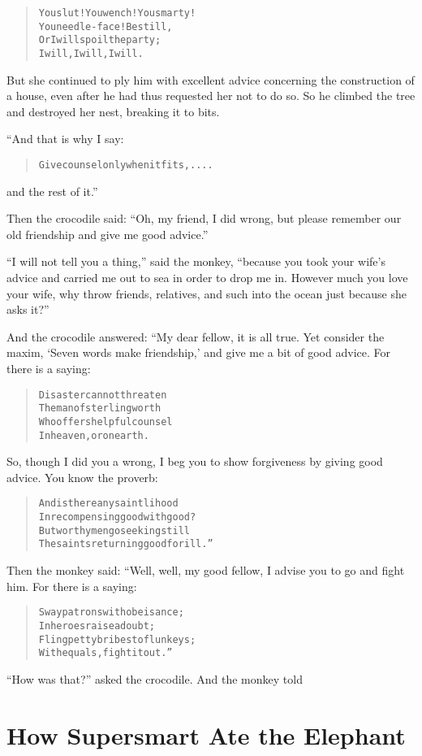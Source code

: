 \documentclass[article, twoside, 10pt]{memoir}
\renewenvironment{verbatim}{%
\begin{quote}%
\vskip -10pt%
\begin{alltt}\normalfont\small}{\end{alltt}%
\end{quote}%
\vskip -10pt
} %
\begin{document}
\begin{verbatim}
You slut! You wench! You smarty!
    You needle-face! Be still,
Or I will spoil the party;
    I will, I will, I will.
\end{verbatim}
But she continued to ply him with excellent advice concerning the
construction of a house, even after he had thus requested her not
to do so. So he climbed the tree and destroyed her nest, breaking
it to bits.

“And that is why I say:

\begin{verbatim}
Give counsel only when it fits, ....
\end{verbatim}
and the rest of it.”

Then the crocodile said:
``Oh, my friend, I did wrong, but please remember our old friendship and give me good advice.''

``I will not tell you a thing,'' said the monkey,
``because you took your wife's advice and carried me out to sea in order to drop me in. However much you love your wife, why throw friends, relatives, and such into the ocean just because she asks it?''

And the crocodile answered: “My dear fellow, it is all true. Yet
consider the maxim, `Seven words make friendship,' and give me a
bit of good advice. For there is a saying:

\begin{verbatim}
Disaster cannot threaten
    The man of sterling worth
Who offers helpful counsel{\textemdash}
    In heaven, or on earth.
\end{verbatim}
So, though I did you a wrong, I beg you to show forgiveness by
giving good advice. You know the proverb:

\begin{verbatim}
And is there any saintlihood
In recompensing good with good?
But worthy men go seeking still
The saints returning good for ill.”
\end{verbatim}
Then the monkey said: “Well, well, my good fellow, I advise you to
go and fight him. For there is a saying:

\begin{verbatim}
Sway patrons with obeisance;
    In heroes raise a doubt;
Fling petty bribes to flunkeys;
    With equals, fight it out.”
\end{verbatim}
``How was that?'' asked the crocodile. And the monkey told

\chapter{How Supersmart Ate the Elephant}
\end{document}
